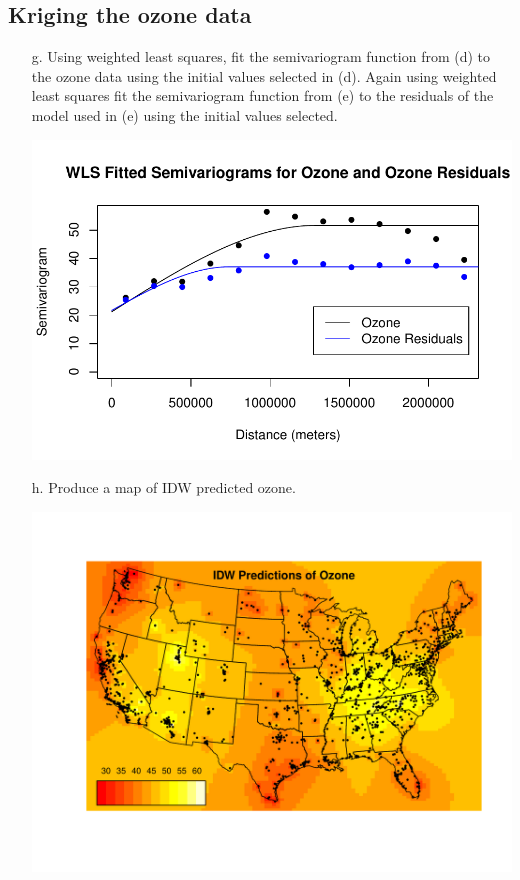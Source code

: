 \documentclass[letterpaper, 12pt]{article}\usepackage[]{graphicx}\usepackage[]{color}
\makeatletter
\def\maxwidth{ %
  \ifdim\Gin@nat@width>\linewidth
    \linewidth
  \else
    \Gin@nat@width
  \fi
}
\newenvironment{knitrout}{}{} %
\makeatother
\begin{document}
\subsection*{Kriging the ozone data}
\begin{enumerate}
\item[g.]
Using weighted least squares, fit the semivariogram function from (d) to the ozone data using the initial values selected in (d). Again using weighted least squares fit the semivariogram function from (e) to the residuals of the model used in (e) using the initial values selected.

\begin{knitrout}
\color{fgcolor}
\includegraphics[width=\maxwidth]{figure/krig} 

\end{knitrout}


\item[h.]
Produce a map of IDW predicted ozone.

\begin{knitrout}
\color{fgcolor}
\includegraphics[width=\maxwidth]{figure/idw} 


\end{knitrout}
\end{enumerate}
\end{document}

